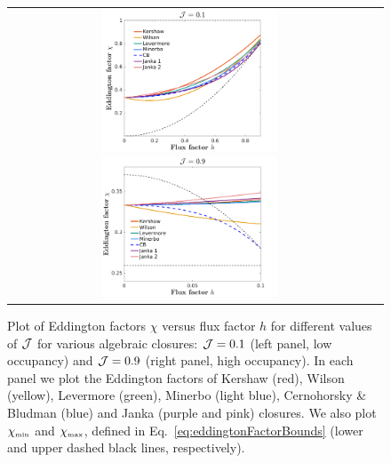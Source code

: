 \begin{figure}[h]
  \centering
  \begin{tabular}{cc}
    \includegraphics[width=0.5\textwidth]{figures/Closures0_10}
    \includegraphics[width=0.5\textwidth]{figures/Closures0_90}
  \end{tabular}
   \caption{Plot of Eddington factors $\chi$ versus flux factor $h$ for different values of $\mathcal{J}$ for various algebraic closures: $\mathcal{J}=0.1$ (left panel, low occupancy) and $\mathcal{J}=0.9$ (right panel, high occupancy).  In each panel we plot the Eddington factors of Kershaw (red), Wilson (yellow), Levermore (green), Minerbo (light blue), Cernohorsky \& Bludman (blue) and Janka (purple and pink) closures.  We also plot $\chi_{\mbox{\tiny min}}$ and $\chi_{\mbox{\tiny max}}$, defined in Eq.~\eqref{eq:eddingtonFactorBounds} (lower and upper dashed black lines, respectively).}
  \label{fig:EddingtonFactorsWithDifferentClosure}
\end{figure}

